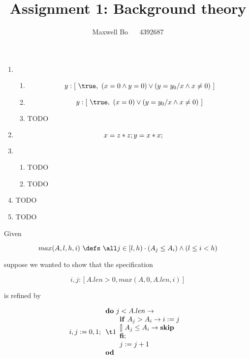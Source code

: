 \documentclass{article}
\title{\bf Assignment 1: Background theory}
\author{Maxwell Bo  ~~ 4392687}
\begin{document}
\maketitle

\begin{enumerate}
	\item 
	\begin{enumerate}
		\item \[ y: [~\true, ~(x = 0 \land y = 0) \lor (y = y_0 / x \land x \neq 0)~]\]
		\item \[ y: [~\true, ~(x = 0) \lor (y = y_0 / x \land x \neq 0)~]\]
		\item TODO
	\end{enumerate}
	\item 
		\[
		x = z * z;\\
		y = x * x;\\
		\]

	\item
	\begin{enumerate}
		\item TODO
		\item TODO
	\end{enumerate}
	\item TODO
	\item TODO
\end{enumerate}

Given 

\[max(A,l,h,i) ~\defs~ \all j \in [l,h) \cdot (A_j \leq A_i) \land (l \leq i < h)\]   %

suppose we wanted to show that the specification

\[i,j:[A.len > 0, max(A,0,A.len,i)]\]

is refined by

\[i,j:=0,1;\\  %
\begin{array}{l}
\Do~ j < A.len \rightarrow\\
\t1 \begin{array}{l}   %
\If~ A_j > A_i \rightarrow i:=j\\
\Choice  A_j \leq A_i \rightarrow {\bf skip} \\
\Fi; \\
j:=j+1\\
\end{array}\\
\Od\\
\end{array}\]
\end{document}
